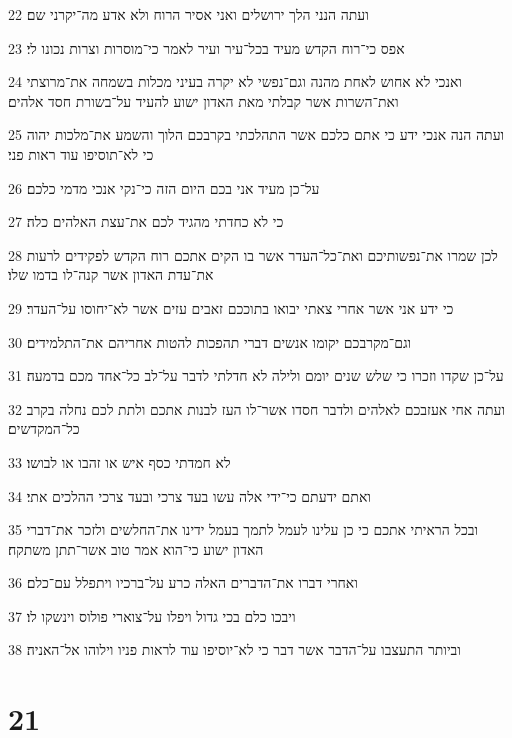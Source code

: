 \par 22 ועתה הנני הלך ירושלים ואני אסיר הרוח ולא אדע מה־יקרני שם׃
\par 23 אפס כי־רוח הקדש מעיד בכל־עיר ועיר לאמר כי־מוסרות וצרות נכונו לי׃
\par 24 ואנכי לא אחוש לאחת מהנה וגם־נפשי לא יקרה בעיני מכלות בשמחה את־מרוצתי ואת־השרות אשר קבלתי מאת האדון ישוע להעיד על־בשורת חסד אלהים׃
\par 25 ועתה הנה אנכי ידע כי אתם כלכם אשר התהלכתי בקרבכם הלוך והשמע את־מלכות יהוה כי לא־תוסיפו עוד ראות פני׃
\par 26 על־כן מעיד אני בכם היום הזה כי־נקי אנכי מדמי כלכם׃
\par 27 כי לא כחדתי מהגיד לכם את־עצת האלהים כלה׃
\par 28 לכן שמרו את־נפשותיכם ואת־כל־העדר אשר בו הקים אתכם רוח הקדש לפקידים לרעות את־עדת האדון אשר קנה־לו בדמו שלו׃
\par 29 כי ידע אני אשר אחרי צאתי יבואו בתוככם זאבים עזים אשר לא־יחוסו על־העדר׃
\par 30 וגם־מקרבכם יקומו אנשים דברי תהפכות להטות אחריהם את־התלמידים׃
\par 31 על־כן שקדו וזכרו כי שלש שנים יומם ולילה לא חדלתי לדבר על־לב כל־אחד מכם בדמעה׃
\par 32 ועתה אחי אעזבכם לאלהים ולדבר חסדו אשר־לו העז לבנות אתכם ולתת לכם נחלה בקרב כל־המקדשים׃
\par 33 לא חמדתי כסף איש או זהבו או לבושו׃
\par 34 ואתם ידעתם כי־ידי אלה עשו בעד צרכי ובעד צרכי ההלכים אתי׃
\par 35 ובכל הראיתי אתכם כי כן עלינו לעמל לתמך בעמל ידינו את־החלשים ולזכר את־דברי האדון ישוע כי־הוא אמר טוב אשר־תתן משתקח׃
\par 36 ואחרי דברו את־הדברים האלה כרע על־ברכיו ויתפלל עם־כלם׃
\par 37 ויבכו כלם בכי גדול ויפלו על־צוארי פולוס וינשקו לו׃
\par 38 וביותר התעצבו על־הדבר אשר דבר כי לא־יוסיפו עוד לראות פניו וילוהו אל־האניה׃

\chapter{21}

